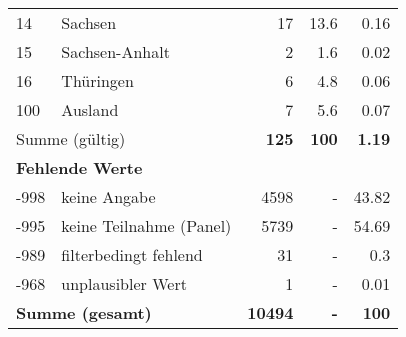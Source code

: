 \begin{longtable}{lXrrr}
     14 &
     \multicolumn{1}{X}{ Sachsen   } &


       \num{17} &
       \num[round-mode=places,round-precision=2]{13.6} &
         \num[round-mode=places,round-precision=2]{0.16} \\

     15 &
     \multicolumn{1}{X}{ Sachsen-Anhalt   } &


       \num{2} &
       \num[round-mode=places,round-precision=2]{1.6} &
         \num[round-mode=places,round-precision=2]{0.02} \\

     16 &
     \multicolumn{1}{X}{ Thüringen   } &


       \num{6} &
       \num[round-mode=places,round-precision=2]{4.8} &
         \num[round-mode=places,round-precision=2]{0.06} \\

     100 &
     \multicolumn{1}{X}{ Ausland   } &


       \num{7} &
       \num[round-mode=places,round-precision=2]{5.6} &
         \num[round-mode=places,round-precision=2]{0.07} \\
     \midrule
     \multicolumn{2}{l}{Summe (gültig)} &
       \textbf{\num{125}} &
     \textbf{\num{100}} &
       \textbf{\num[round-mode=places,round-precision=2]{1.19}} \\
     \multicolumn{5}{l}{\textbf{Fehlende Werte}}\\
       -998 &
       keine Angabe &
         \num{4598} &
        - &
         \num[round-mode=places,round-precision=2]{43.82} \\
       -995 &
       keine Teilnahme (Panel) &
         \num{5739} &
        - &
         \num[round-mode=places,round-precision=2]{54.69} \\
       -989 &
       filterbedingt fehlend &
         \num{31} &
        - &
         \num[round-mode=places,round-precision=2]{0.3} \\
       -968 &
       unplausibler Wert &
         \num{1} &
        - &
         \num[round-mode=places,round-precision=2]{0.01} \\
     \midrule
     \multicolumn{2}{l}{\textbf{Summe (gesamt)}} &
          \textbf{\num{10494}} &
        \textbf{-} &
        \textbf{\num{100}} \\
     \bottomrule
     \end{longtable}
     
